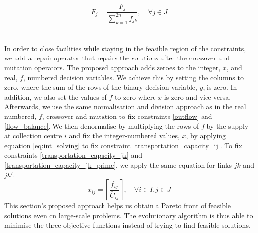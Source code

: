 \documentclass[mscthesis, 11pt]{usiinfthesis}
\theoremstyle{newdefinition}
\begin{document}
\begin{equation}\label{eq:sum_inc_one}
    F_j = \frac{F_j}{\sum_{k = 1}^{2n} f_{jk}}, \quad \forall j \in J
\end{equation}
\\\\
In order to close facilities while staying in the feasible region of the constraints, we add a repair operator that repairs the solutions after the crossover and mutation operators. The proposed approach adds zeroes to the integer, $x$, and real, $f$, numbered decision variables. We achieve this by setting the columns to zero, where the sum of the rows of the binary decision variable, $y$, is zero. In addition, we also set the values of $f$ to zero where $x$ is zero and vice versa. Afterwards, we use the same normalisation and division approach as in the real numbered, $f$, crossover and mutation to fix constraints \ref{outflow} and \ref{flow_balance}. We then denormalise by multiplying the rows of $f$ by the supply at collection centre $i$ and fix the integer-numbered values, $x$, by applying equation \ref{eq:int_solving} to fix constraint \ref{transportation_capacity_ij}. To fix constraints \ref{transportation_capacity_jk} and \ref{transportation_capacity_jk_prime}, we apply the same equation for links $jk$ and $jk'$. 
\begin{equation}\label{eq:int_solving}
    x_{ij} = \left\lceil \frac{f_{ij}}{\overline{C}_{ij}} \right\rceil, \quad \forall i \in I, j \in J
\end{equation}
This section's proposed approach helps us obtain a Pareto front of feasible solutions even on large-scale problems. The evolutionary algorithm is thus able to minimise the three objective functions instead of trying to find feasible solutions.
\end{document}
